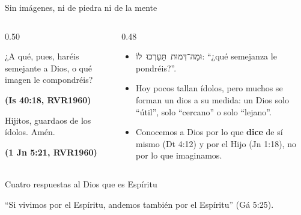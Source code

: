 \documentclass[hyperref={bookmarks=false},aspectratio=169]{beamer}
\newcommand{\heb}[1]{\mbox{\foreignlanguage{hebrew}{#1}}}
\newcommand{\fuente}[1]{\par\hfill{\upshape\bfseries\footnotesize\textcolor{azul}{#1}}}
\newcommand{\destacar}[1]{\textbf{\textcolor{azul}{#1}}}
\begin{document}
\begin{frame}{Sin imágenes, ni de piedra ni de la mente}
\begin{columns}[t,onlytextwidth]
\begin{column}{0.50\textwidth}
\begin{cita}¿A qué, pues, haréis semejante a Dios, o qué imagen le compondréis?\fuente{(Is 40:18, RVR1960)}\end{cita}
\begin{cita}Hijitos, guardaos de los ídolos. Amén.\fuente{(1 Jn 5:21, RVR1960)}\end{cita}
\end{column}
\begin{column}{0.48\textwidth}\small
\begin{itemize}
\item \heb{וּמַה־דְּמוּת תַּעַרְכוּ לוֹ}: ``¿qué semejanza le pondréis?''.
\item Hoy pocos tallan ídolos, pero muchos se forman un dios a su medida: un Dios solo ``útil'', solo ``cercano'' o solo ``lejano''.
\item Conocemos a Dios por lo que \destacar{dice} de sí mismo (Dt 4:12) y por el Hijo (Jn 1:18), no por lo que imaginamos.
\end{itemize}
\end{column}
\end{columns}
\end{frame}

\begin{frame}{Cuatro respuestas al Dios que es Espíritu}
\centering
{}\par\medskip
\small\RaggedRight ``Si vivimos por el Espíritu, andemos también por el Espíritu'' (Gá 5:25).
\end{frame}
\end{document}
